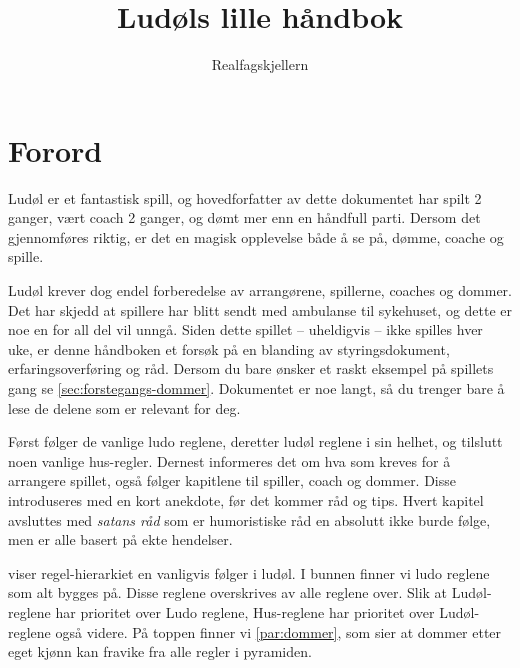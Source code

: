 \documentclass[10pt,a4paper,norsk,openany]{book}
\author{Realfagskjellern}
\title{Ludøls lille håndbok}
\begin{document}
\frontmatter

\maketitle

\section*{Forord}

Ludøl er et fantastisk spill, og hovedforfatter av dette dokumentet har spilt 2
ganger, vært coach 2 ganger, og dømt mer enn en håndfull parti. Dersom det
gjennomføres riktig, er det en magisk opplevelse både å se på, dømme, coache
og spille.  

Ludøl krever dog endel forberedelse av arrangørene, spillerne, coaches og
dommer. Det har skjedd at spillere har blitt sendt med ambulanse til sykehuset,
og dette er noe en for all del vil unngå. Siden dette spillet -- uheldigvis --
ikke spilles hver uke, er denne håndboken et forsøk på en blanding av
styringsdokument, erfaringsoverføring og råd. Dersom du bare ønsker et raskt
eksempel på spillets gang se \cref{sec:forstegangs-dommer}. Dokumentet er noe
langt, så du trenger bare å lese de delene som er relevant for deg.

Først følger de vanlige ludo reglene, deretter ludøl reglene i sin helhet, og
tilslutt noen vanlige hus-regler. Dernest informeres det om hva som kreves for
å arrangere spillet, også følger kapitlene til spiller, coach og dommer. Disse
introduseres med en kort anekdote, før det kommer råd og tips. Hvert kapitel
avsluttes med \emph{satans råd} som er humoristiske råd en absolutt ikke burde
følge, men er alle basert på ekte hendelser.

 viser regel-hierarkiet en vanligvis følger i ludøl. I
bunnen finner vi ludo reglene som alt bygges på. Disse reglene overskrives av
alle reglene over. Slik at Ludøl-reglene har prioritet over Ludo reglene,
Hus-reglene har prioritet over Ludøl-reglene også videre. På toppen finner vi
\cref{par:dommer}, som sier at dommer etter eget kjønn kan fravike fra alle regler i
pyramiden.

\begin{figure}[htbp!]
  \centering
  
  \caption{}
  \label{fig:maslows-ludol}
\end{figure}

\tableofcontents

\mainmatter
\end{document}
